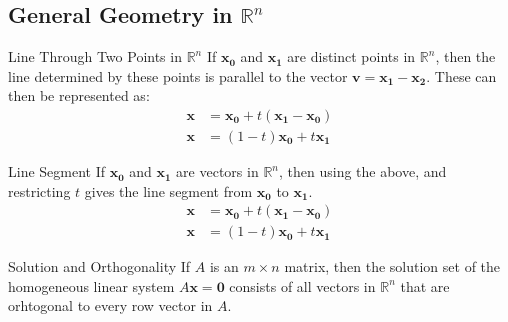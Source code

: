 \documentclass[\main/notes.tex]{subfiles}
\begin{document}
			\subsection[General Geometry]{General Geometry in $\mathbb{R}^{n}$}
				\begin{sidenote}{Line Through Two Points in $\mathbb{R}^{n}$}
					If $\mathbf{x_{0}}$ and $\mathbf{x_{1}}$ are distinct points in $\mathbb{R}^{n}$, then the line determined by these points is parallel to the vector $\mathbf{v} = \mathbf{x_{1}} - \mathbf{x_{2}}$. These can then be represented as:
					\begin{align*}
						\mathbf{x} &= \mathbf{x_{0}} + t(\mathbf{x_{1}} - \mathbf{x_{0}})\\
						\mathbf{x} &= (1 - t)\mathbf{x_{0}} + t\mathbf{x_{1}}
					\end{align*}
				\end{sidenote}
				\begin{theorem}{Line Segment}
					If $\mathbf{x_{0}}$ and $\mathbf{x_{1}}$ are vectors in $\mathbb{R}^{n}$, then using the above, and restricting $t$ gives the line segment from $\mathbf{x_{0}}$ to $\mathbf{x_{1}}$.
					\begin{align*}
						\mathbf{x} &= \mathbf{x_{0}} + t(\mathbf{x_{1}} - \mathbf{x_{0}}) \tag*{$(0 \leq t \leq 1)$}\\
						\mathbf{x} &= (1 - t)\mathbf{x_{0}} + t\mathbf{x_{1}} \tag*{$(0 \leq t \leq 1)$}
					\end{align*}
				\end{theorem}
				\begin{theorem}{Solution and Orthogonality}
					If $A$ is an $m \times n$ matrix, then the solution set of the homogeneous linear system $A\mathbf{x} = \mathbf{0}$ consists of all vectors in $\mathbb{R}^{n}$ that are orhtogonal to every row vector in $A$.
				\end{theorem}
\end{document}
